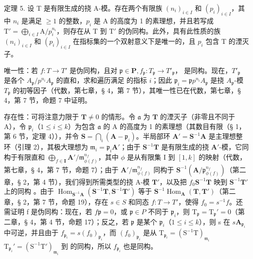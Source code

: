 定理 5. 设 T 是有限生成的挠 A-模。存在两个有限族 \((n_i)_{i\in I}\) 和 \((p_i)_{i\in I}\)，其中 \(n_i\) 是满足 \(\geqslant 1\) 的整数，\(p_i\) 是 A 的高度为 1 的素理想，并且若写成 \(\mathrm{T}' = \bigoplus_{i\in I} \mathrm{A} / p_i^{n_i}\)，则存在从 T 到 \(\mathrm{T}'\) 的伪同构。此外，具有此性质的族 \((n_i)_{i\in I}\) 和 \((p_i)_{i\in I}\) 在指标集的一个双射意义下是唯一的，且 \(p_i\) 包含 T 的湮灭子。

唯一性：若 \(f\colon T\to T'\) 是伪同构，且对 \(\mathfrak{p}\in\mathbf{P},f_{\mathfrak{p}}\colon T_{\mathfrak{p}}\to T'_{\mathfrak{p}}\)， 是同构。现在，\(T'_{\mathfrak{p}}\) 是各个 \(A_{\mathfrak{p}}/p^{n_{i}}A_{\mathfrak{p}}\) 的直和，求和遍历满足  的指标 \(i\)；因此 \(\mathfrak{p}_{i}=\mathfrak{p}\)\(p^{n_{i}}A_{\mathfrak{p}}\) 是挠 \(A_{\mathfrak{p}}\)-模 \(T_{\mathfrak{p}}\) 的初等因子（代数，第七章，§ 4，第 7 节），其唯一性已在代数，第七章，§ 4，第 7 节，命题 7 中证明。

存在性：可将注意力限于 \(\mathbf{T} \neq 0\) 的情形。令 \(\mathfrak{a}\) 为 \(\mathbf{T}\) 的湮灭子（非零且不同于 A），令 \(\mathfrak{p}_i\)（\(1 \leqslant i \leqslant k\)）为包含 \(\mathfrak{a}\) 的 A 的高度为 1 的素理想（其数目有限（§ 1，第 6 节，定理 4）），并令 \(\mathbf{S} = \bigcap_i (\mathbf{A} - \mathfrak{p}_i)\)。半局部环 \(\mathbf{A}' = \mathbf{S}^{-1}\mathbf{A}\) 是主理想整环（引理 2），其极大理想为 \(\mathfrak{m}_i = \mathfrak{p}_i\mathbf{A}'\)；由于 \(\mathbf{S}^{-1}\mathbf{T}\) 是有限生成的挠 \(\mathbf{A}'\)-模，它同构于有限直和 \(\bigoplus_{f \in \mathbf{I}} \mathbf{A}' / \mathfrak{m}_{\phi(f)}^{n_f}\)，其中 \(\phi\) 是从有限集 I 到 \([1, k]\) 的映射（代数，第七章，§ 4，第 7 节，命题 7）；由于 \(\mathbf{A}' / \mathfrak{m}_{\phi(f)}^{n_f}\) 同构于 \(\mathbf{S}^{-1}(\mathbf{A} / \mathfrak{p}_{\phi(f)}^{n_f})\)（第二章，§ 2，第 4 节），我们得到所需类型的挠 A-模 \(\mathbf{T}'\)，以及把 \(f_0\)\(\mathbf{S}^{-1}\mathbf{T}\) 映到 \(\mathbf{S}^{-1}\mathbf{T}'\) 上的同构 。由于 \(\operatorname{Hom}_{\mathbf{S}^{-1}\mathbf{A}}(\mathbf{S}^{-1}\mathbf{T}, \mathbf{S}^{-1}\mathbf{T}')\) 等于 \(\mathbf{S}^{-1}\operatorname{Hom}_{\mathbf{A}}(\mathbf{T}, \mathbf{T}')\)（第二章，§ 2，第 7 节，命题 19），存在 \(s \in S\) 和同态 \(f: T \to T'\)，使得 \(f_0 = s^{-1}f\)。还需证明 f 是伪同构：现在，若 \(f\)\(\mathfrak{p} = 0\)，或 \(\mathfrak{p} \in P\) 不同于 \(\mathfrak{p}_i\)，则 \(\mathrm{T}_{\mathfrak{p}} = \mathrm{T}_{\mathfrak{p}}' = 0\)（第二章，§ 4，第 4 节，命题 17）；反之，若 \(\mathfrak{p}\) 是某个 \(\mathfrak{p}_i\)（\(1 \leqslant i \leqslant k\)），则 s 在 \(s\)\(\mathbf{A}_{\mathfrak{p}_i}\) 中可逆，并且由于 \(f_{\mathfrak{p}_i} = s(f_0)_{\mathfrak{p}_i}\)，而 \((f_0)_{\mathfrak{p}_i}\) 是从 \(\mathrm{T}_{\mathfrak{p}_i} = (\mathrm{S}^{-1}\mathrm{T})_{\mathfrak{m}_i}\)\(\mathrm{T}_{\mathfrak{p}_i}' = (\mathrm{S}^{-1}\mathrm{T}')_{\mathfrak{m}_i}\) 到  的同构，所以 \(f_{\mathfrak{p}_i}\) 也是同构。

